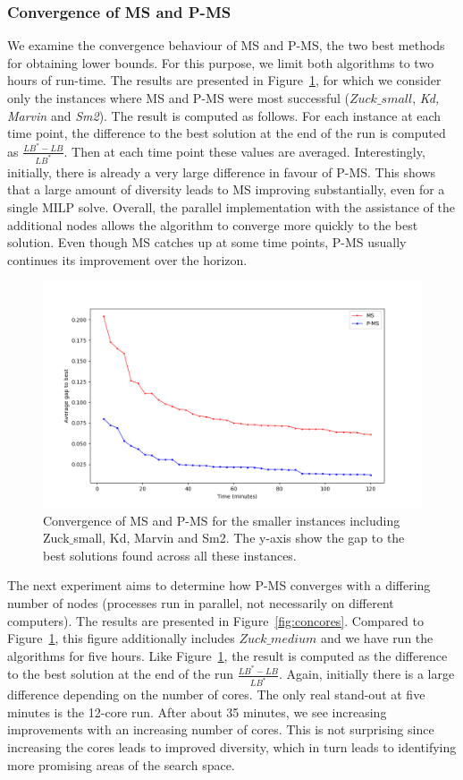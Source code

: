 \documentclass[authoryear,11pt,square,number,times,super,comma]{elsarticle}
\begin{document}
\subsubsection{Convergence of MS and P-MS}
We examine the convergence behaviour of MS and P-MS, the two best methods for obtaining lower bounds. For this purpose, we limit both algorithms to two hours of run-time. The results are presented in Figure~\ref{fig:con_summary}, for which we consider only the instances where MS and P-MS were most successful ($Zuck\_small$, \emph{Kd, Marvin} and \emph{Sm2}). The result is computed as follows. For each instance at each time point, the difference to the best solution at the end of the run is computed as $\frac{LB^*-LB}{LB^*}$. Then at each time point these values are averaged. Interestingly, initially, there is already a very large difference in favour of P-MS. This shows that a large amount of diversity leads to MS improving substantially, even for a single MILP solve. Overall, the parallel implementation with the assistance of the additional nodes allows the algorithm to converge more quickly to the best solution. Even though MS catches up at some time points, P-MS usually continues its improvement over the horizon. 

\begin{figure}[htbp]
  \includegraphics[width=15cm]{Convergence_summary}
  \centering
  \caption{Convergence of MS and P-MS for the smaller instances including Zuck$\_$small, Kd, Marvin and Sm2. The y-axis show the gap to the 
  best solutions found across all these instances.}
  \label{fig:con_summary}
\end{figure}

The next experiment aims to determine how P-MS converges with a differing number of nodes (processes run in parallel, not necessarily on different computers). The results are presented in Figure~\ref{fig:concores}. Compared to Figure~\ref{fig:con_summary}, this figure additionally includes $Zuck\_medium$ and we have run the algorithms for five hours. Like Figure~\ref{fig:con_summary}, the result is computed as the difference to the best solution at the end of the run $\frac{LB^*-LB}{LB^*}$. Again, initially there is a large difference depending on the number of cores. The only real stand-out at five minutes is the 12-core run. After about 35 minutes, we see increasing improvements with an increasing number of cores. This is not surprising since increasing the cores leads to improved diversity, which in turn leads to identifying more promising areas of the search space.
\end{document}
